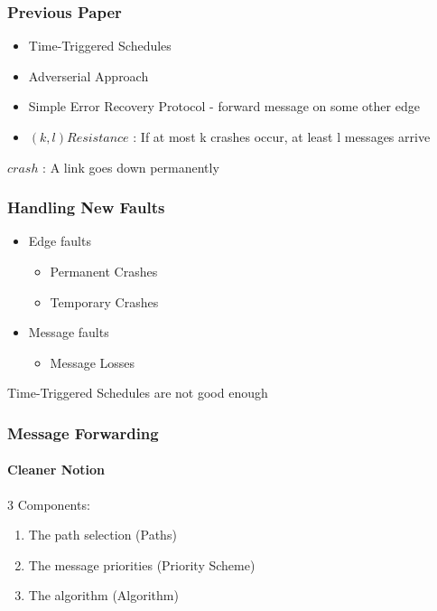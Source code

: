 \documentclass{beamer}
\begin{document}
\begin{frame}
\frametitle{Previous Paper}
	\begin{itemize}
	\item Time-Triggered Schedules
	\item Adverserial Approach
	\item Simple Error Recovery Protocol - forward message on some other edge
	\item $(k,l) Resistance$ : If at most k crashes occur, at least l messages arrive\\[3ex]
	\end{itemize}
	\hspace*{20pt}$ crash $ : A link goes down permanently
\end{frame}

\begin{frame}
\frametitle{Handling New Faults}
	\begin{itemize}
	\item Edge faults
	\begin{itemize}
		\item Permanent Crashes 
		\item Temporary Crashes
	\end{itemize}
	\item Message faults
	\begin{itemize}
		\item Message Losses\\[2ex]
	\end{itemize}
	\end{itemize}
	\pause
	\begin{center}
	\color{red}
	Time-Triggered Schedules are not good enough
	\end{center}
\end{frame}

\begin{frame}
\frametitle{Message Forwarding}
	\framesubtitle{Cleaner Notion}
	3 Components:\\
	\begin{enumerate}
	\item The path selection (Paths)
	\item The message priorities (Priority Scheme)
	\item The algorithm (Algorithm)
	\end{enumerate}
\end{frame}
\end{document}
